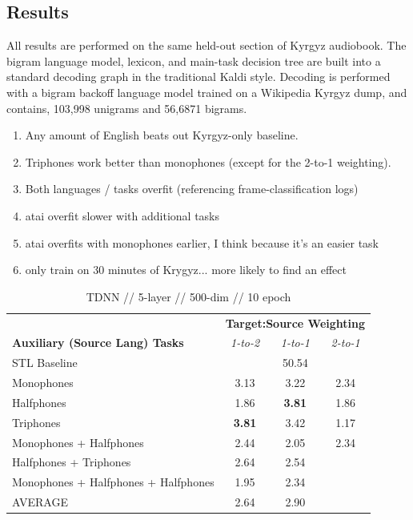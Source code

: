 \documentclass[a4paper]{article}
\begin{document}
\subsection{Results}


All results are performed on the same held-out section of Kyrgyz audiobook. The bigram language model, lexicon, and main-task decision tree are built into a standard decoding graph in the traditional Kaldi style. Decoding is performed with a bigram backoff language model trained on a Wikipedia Kyrgyz dump, and contains, 103,998 unigrams and 56,6871 bigrams.


\begin{enumerate}
\item Any amount of English beats out Kyrgyz-only baseline.
\item Triphones work better than monophones (except for the 2-to-1 weighting).
\item Both languages / tasks overfit (referencing frame-classification logs)
\item atai overfit slower with additional tasks
\item atai overfits with monophones earlier, I think because it's an easier task
\item only train on 30 minutes of Krygyz... more likely to find an effect
\end{enumerate}




\begin{table}[!htbp]
  \centering
    \caption{TDNN // 5-layer // 500-dim //  10 epoch }
  \begin{adjustbox}{width=.45\textwidth}
    \begin{tabular}{lccc}
      \toprule
      & \multicolumn{3}{c}{\textbf{Target:Source Weighting}} \\
      \textbf{Auxiliary (Source Lang) Tasks} & \textit{1-to-2} & \textit{1-to-1} & \textit{2-to-1}\\
      \midrule
      STL Baseline                          &  \multicolumn{3}{c}{50.54}  \\
      Monophones                            &  3.13  & 3.22 & 2.34  \\
      Halfphones                            &  1.86  & \textbf{3.81} & 1.86 \\
      Triphones                             &  \textbf{3.81} & 3.42 & 1.17  \\
      Monophones + Halfphones               &  2.44  & 2.05 &  2.34\\
      Halfphones + Triphones                &  2.64  & 2.54 & \\
      Monophones + Halfphones + Halfphones  &  1.95  & 2.34 & \\
      \midrule
      AVERAGE                               &  2.64  & 2.90 & \\
      \bottomrule
    \end{tabular}
    \label{table:data}
  \end{adjustbox}
\end{table}
\end{document}
